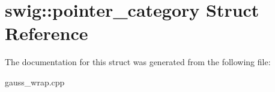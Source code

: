 \hypertarget{structswig_1_1pointer__category}{\section{swig\-:\-:pointer\-\_\-category Struct Reference}
\label{structswig_1_1pointer__category}
}


The documentation for this struct was generated from the following file\-:\begin{DoxyCompactItemize}
\item 
gauss\-\_\-wrap.\-cpp\end{DoxyCompactItemize}

